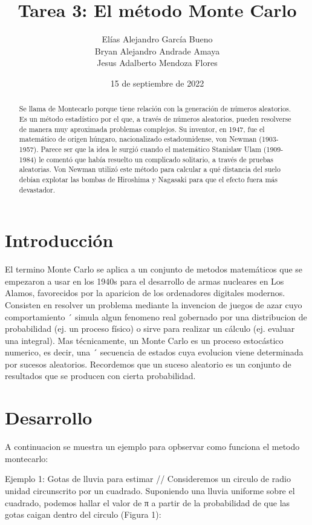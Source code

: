 \documentclass{article}
\author{Elías Alejandro García Bueno \\
Bryan Alejandro Andrade Amaya \\ Jesus Adalberto Mendoza Flores} %
\title{Tarea 3: El método Monte Carlo} %
\date{15 de septiembre de 2022}
\begin{document}

\maketitle %

\begin{abstract} %
Se llama de Montecarlo porque tiene relación con la generación de números aleatorios. Es un método estadístico por el que, a través de números aleatorios, pueden resolverse de manera muy aproximada problemas complejos. Su inventor, en 1947, fue el matemático de origen húngaro, nacionalizado estadounidense, von Newman (1903-1957). Parece ser que la idea le surgió cuando el matemático Stanislaw Ulam (1909-1984) le comentó que había resuelto un complicado solitario, a través de pruebas aleatorias. Von Newman utilizó este método para calcular a qué distancia del suelo debían explotar las bombas de Hiroshima y Nagasaki para que el efecto fuera más devastador.\cite{barreras2015metodo} 

\end{abstract}

\section{Introducción}\label{intro} %
\item 
El termino Monte Carlo se aplica a un conjunto de metodos matemáticos que se empezaron a usar en los 1940s para el desarrollo de armas nucleares en Los Alamos, favorecidos por la aparicion de los ordenadores digitales modernos. Consisten en resolver un problema mediante la invencion de juegos de azar cuyo comportamiento ´ simula algun fenomeno real gobernado por una distribucion de probabilidad (ej. un proceso físico) o sirve para realizar un cálculo (ej. evaluar una integral).
Mas técnicamente, un Monte Carlo es un proceso estocástico numerico, es decir, una ´
secuencia de estados cuya evolucion viene determinada por sucesos aleatorios. Recordemos que un suceso aleatorio es un conjunto de resultados que se producen con cierta probabilidad. \cite{illana2013metodos}


\section{Desarrollo}
\item 
A continuacion se muestra un ejemplo para opbservar como funciona el metodo montecarlo:
\item
Ejemplo 1: Gotas de lluvia para estimar //
Consideremos un circulo de radio unidad circunscrito por un cuadrado. Suponiendo una
lluvia uniforme sobre el cuadrado, podemos hallar el valor de π a partir de la probabilidad de que las gotas caigan dentro del circulo (Figura 1):
\end{document}
